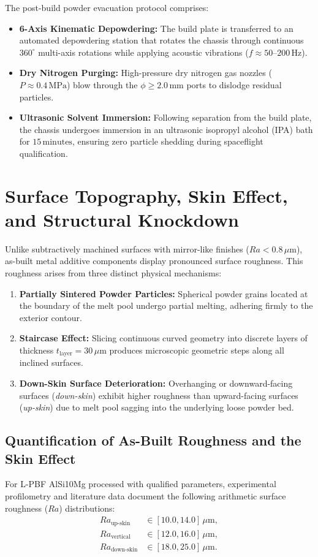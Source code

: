 The post-build powder evacuation protocol comprises:
\begin{itemize}
\item \textbf{6-Axis Kinematic Depowdering:} The build plate is transferred to an automated depowdering station that rotates the chassis through continuous $360^\circ$ multi-axis rotations while applying acoustic vibrations ($f \approx 50\text{--}200\,\text{Hz}$).
\item \textbf{Dry Nitrogen Purging:} High-pressure dry nitrogen gas nozzles ($P \approx 0.4\,\text{MPa}$) blow through the $\phi \ge 2.0\,\text{mm}$ ports to dislodge residual particles.
\item \textbf{Ultrasonic Solvent Immersion:} Following separation from the build plate, the chassis undergoes immersion in an ultrasonic isopropyl alcohol (IPA) bath for $15\,\text{minutes}$, ensuring zero particle shedding during spaceflight qualification.
\end{itemize}

\section{Surface Topography, Skin Effect, and Structural Knockdown}
\label{sec:skin_effect}

Unlike subtractively machined surfaces with mirror-like finishes ($Ra < 0.8\,\mu\text{m}$), as-built metal additive components display pronounced surface roughness. This roughness arises from three distinct physical mechanisms:
\begin{enumerate}
\item \textbf{Partially Sintered Powder Particles:} Spherical powder grains located at the boundary of the melt pool undergo partial melting, adhering firmly to the exterior contour.
\item \textbf{Staircase Effect:} Slicing continuous curved geometry into discrete layers of thickness $t_{\text{layer}} = 30\,\mu\text{m}$ produces microscopic geometric steps along all inclined surfaces.
\item \textbf{Down-Skin Surface Deterioration:} Overhanging or downward-facing surfaces (\textit{down-skin}) exhibit higher roughness than upward-facing surfaces (\textit{up-skin}) due to melt pool sagging into the underlying loose powder bed.
\end{enumerate}

\subsection{Quantification of As-Built Roughness and the Skin Effect}
For L-PBF AlSi10Mg processed with qualified parameters, experimental profilometry and literature data \cite{trevisan2017,collini2024} document the following arithmetic surface roughness ($Ra$) distributions:
\begin{align}
Ra_{\text{up-skin}} &\in [10.0, 14.0]\,\mu\text{m}, \\
Ra_{\text{vertical}} &\in [12.0, 16.0]\,\mu\text{m}, \\
Ra_{\text{down-skin}} &\in [18.0, 25.0]\,\mu\text{m}.
\end{align}

